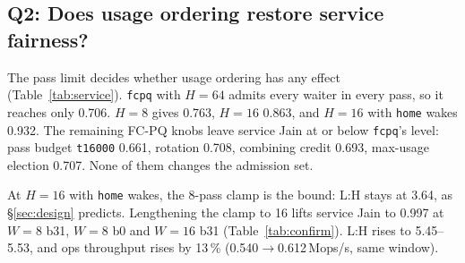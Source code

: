\documentclass[10pt,twocolumn]{article}
\newcommand{\lk}[1]{\texttt{#1}}
\begin{document}
\subsection{Q2: Does usage ordering restore service fairness?}\label{sec:q2}

\begin{table}[t]
\centering\footnotesize
{}
\caption{Service fairness, $W{=}8$, sustained, b31. Upper block: phase 3
  (09-28). Lower block: same-window A/B and clamp sweep (09-29, 3.0\,GHz cap);
  \lk{-c$N$} is \lk{fcpq-h16-home} with starvation clamp $N$ (0 = off) and
  newcomer init \emph{mean}. ``model $J$'' is the two-class model applied to
  the measured L:H and per-class costs. L:H, util and non-CS/op are medians (max spread 5\,\% of the median). util $=$ CS cycles / window. non-CS/op $=$
  (window $-$ CS cycles) / ops; only for the FC-family rows, whose combiner is busy almost the whole window, is it the per-op lock cost $o$ of \S\ref{sec:design}; for \lk{dispatch} and \lk{ces} it also contains lock-idle and hand-off time. Max wait is in combining passes. Do not compare
  rows across the two blocks.}
\label{tab:service}
\end{table}

\begin{table}[t]
\centering\footnotesize\setlength{\tabcolsep}{3pt}
\caption{Clamp 8 vs.\ 16 for \lk{fcpq-h16-home} in the confirmation cells
  (09-29 window). Heavy p99 is run latency in $\mu$s; L:H, p99 and burden $J$ are medians.}
\label{tab:confirm}
\end{table}

The pass limit decides whether usage ordering has any effect
(Table~\ref{tab:service}). \lk{fcpq} with $H{=}64$ admits every waiter in every
pass, so it reaches only 0.706. $H{=}8$ gives 0.763, $H{=}16$ 0.863, and
$H{=}16$ with \lk{home} wakes 0.932. The remaining FC-PQ knobs leave service Jain at or below \lk{fcpq}'s level:
pass budget \lk{t16000} 0.661, rotation 0.708, combining credit 0.693,
max-usage election 0.707. None of them changes the admission set.

At $H{=}16$ with \lk{home} wakes, the 8-pass clamp is the bound: L:H stays at
3.64, as \S\ref{sec:design} predicts. Lengthening the clamp to 16 lifts
service Jain to 0.997 at $W{=}8$ b31, $W{=}8$ b0 and $W{=}16$ b31
(Table~\ref{tab:confirm}). L:H rises to 5.45--5.53, and ops throughput rises
by 13\,\% (0.540$\to$0.612\,Mops/s, same window).
\end{document}

